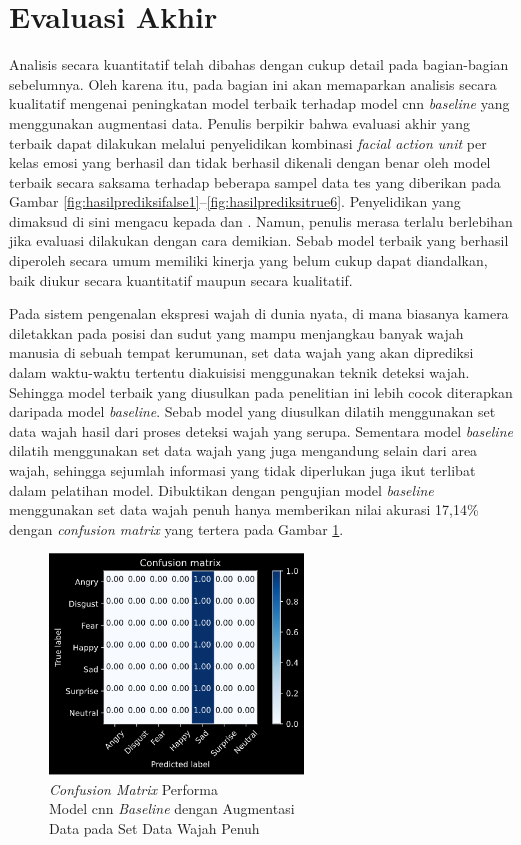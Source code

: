 \section{Evaluasi Akhir}
Analisis secara kuantitatif telah dibahas dengan cukup detail pada bagian-bagian sebelumnya. Oleh karena itu, pada bagian ini akan memaparkan analisis secara kualitatif mengenai peningkatan model terbaik terhadap model \acrshort{cnn} \textit{baseline} yang menggunakan augmentasi data. Penulis berpikir bahwa evaluasi akhir yang terbaik dapat dilakukan melalui penyelidikan kombinasi \textit{facial action unit} per kelas emosi yang berhasil dan tidak berhasil dikenali dengan benar oleh model terbaik secara saksama terhadap beberapa sampel data tes yang diberikan pada Gambar \ref{fig:hasilprediksifalse1}--\ref{fig:hasilprediksitrue6}. Penyelidikan yang dimaksud di sini mengacu kepada  dan . Namun, penulis merasa terlalu berlebihan jika evaluasi dilakukan dengan cara demikian. Sebab model terbaik yang berhasil diperoleh secara umum memiliki kinerja yang belum cukup dapat diandalkan, baik diukur secara kuantitatif maupun secara kualitatif.

Pada sistem pengenalan ekspresi wajah di dunia nyata, di mana biasanya kamera diletakkan pada posisi dan sudut yang mampu menjangkau banyak wajah manusia di sebuah tempat kerumunan, set data wajah yang akan diprediksi dalam waktu-waktu tertentu diakuisisi menggunakan teknik deteksi wajah. Sehingga model terbaik yang diusulkan pada penelitian ini lebih cocok diterapkan daripada model \textit{baseline}. Sebab model yang diusulkan dilatih menggunakan set data wajah hasil dari proses deteksi wajah yang serupa. Sementara model \textit{baseline} dilatih menggunakan set data wajah yang juga mengandung selain dari area wajah, sehingga sejumlah informasi yang tidak diperlukan juga ikut terlibat dalam pelatihan model. Dibuktikan dengan pengujian model \textit{baseline} menggunakan set data wajah penuh hanya memberikan nilai akurasi 17,14\% dengan \textit{confusion matrix} yang tertera pada Gambar \ref{fig:hasileksperimen2enm}.
\begin{figure}[t]
    \centering
    \includegraphics[width=6.75cm]{gambar/eksperimen2_matriks2.png}
    \caption{\textit{Confusion Matrix} Performa\\Model \acrshort{cnn} \textit{Baseline} dengan Augmentasi\\Data pada Set Data Wajah Penuh}
    \label{fig:hasileksperimen2enm}
\end{figure}

